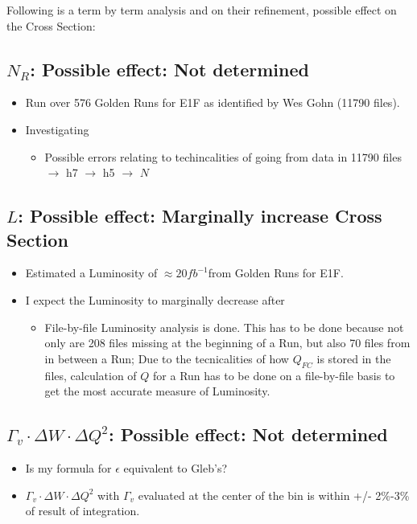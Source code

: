 \documentclass[12pt]{article}
\begin{document}
Following is a term by term analysis and on their refinement, possible effect on the Cross Section:
\subsection{$N_{R}$: Possible effect: Not determined}
\begin{itemize}
	\item Run over 576 Golden Runs for E1F as identified by Wes Gohn (11790 files).
	\item Investigating 
	\begin{itemize}
		\item Possible errors relating to techincalities of going from data in 11790 files $\rightarrow$ h7 $\rightarrow$ h5 $\rightarrow$ $N$
	\end{itemize}
\end{itemize}

\subsection{$L$: Possible effect: Marginally increase Cross Section}
\begin{itemize}
	\item Estimated a Luminosity of $\approx 20 fb^{-1}$from Golden Runs for E1F.
	\item I expect the Luminosity to marginally decrease after
	\begin{itemize}
		\item File-by-file Luminosity analysis is done. This has to be done because not only are 208 files missing at the beginning of a Run, but also 70 files from in between a Run; Due to the tecnicalities of how $Q_{FC}$ is stored in the files, calculation of $Q$ for a Run has to be done on a file-by-file basis to get the most accurate measure of Luminosity.
	\end{itemize}
\end{itemize}

\subsection{$\Gamma_{v} \cdot \Delta W \cdot \Delta Q^{2}$: Possible effect: Not determined}
\begin{itemize}
	\item Is my formula for $\epsilon$ equivalent to Gleb's?
	\item $\Gamma_{v} \cdot \Delta W \cdot \Delta Q^{2}$ with $\Gamma_{v}$ evaluated at the center of the bin is within +/- 2\%-3\% of result of integration. 
\end{itemize}
\end{document}
